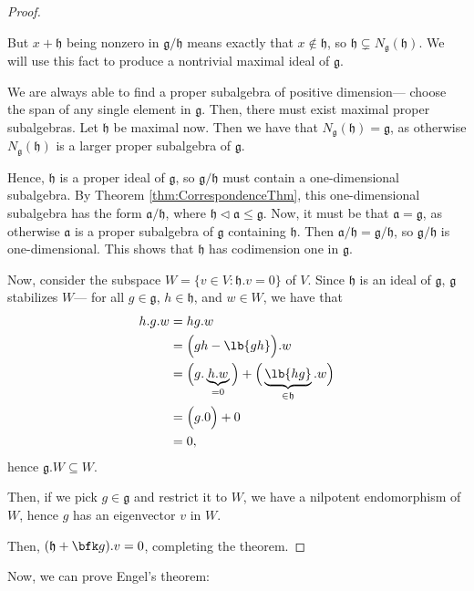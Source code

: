 \documentclass{article}
\newcommand*\tle{\ensuremath{\mathrel{\lhd}}}
\DeclarePairedDelimiter\lb\lbrack\rbrack
\newcommand*\frka{{\ensuremath{\mathfrak{a}}}}
\newcommand*\frkg{{\ensuremath{\mathfrak{g}}}}
\newcommand*\frkh{{\ensuremath{\mathfrak{h}}}}
\newcommand*\acts{.}
\begin{document}
\begin{proof}
\begin{itemize}
            But $x + \frkh$ being nonzero in $\frkg/\frkh$ means exactly that $x \notin \frkh$, so $\frkh \subsetneq N_\frkg(\frkh)$.
            We will use this fact to produce a nontrivial maximal ideal of $\frkg$.

            We are always able to find a proper subalgebra of positive dimension--- choose the span of any single element in $\frkg$. 
            Then, there must exist maximal proper subalgebras. 
            Let $\frkh$ be maximal now. 
            Then we have that $N_\frkg(\frkh) = \frkg$, as otherwise $N_\frkg(\frkh)$ is a larger proper subalgebra of $\frkg$.

            Hence, $\frkh$ is a proper ideal of $\frkg$, so $\frkg/\frkh$ must contain a one-dimensional subalgebra.
            By Theorem \ref{thm:CorrespondenceThm}, this one-dimensional subalgebra has the form $\frka/\frkh$, where $\frkh \tle \frka \leq \frkg$.
            Now, it must be that $\frka = \frkg$, as otherwise $\frka$ is a proper subalgebra of $\frkg$ containing $\frkh$.
            Then $\frka/\frkh = \frkg/\frkh$, so $\frkg/\frkh$ is one-dimensional.
            This shows that $\frkh$ has codimension one in $\frkg$.
    \end{itemize}



    Now, consider the subspace $W = \{ v \in V : \frkh \acts v = 0 \}$ of $V$.
    Since $\frkh$ is an ideal of $\frkg$, $\frkg$ stabilizes $W$--- for all $g \in \frkg$, $h \in \frkh$, and $w \in W$, we have that
    \begin{align*}
        h \acts g \acts w
        &=
        hg \acts w
        \\
        &= 
        \Big(gh - \lb{gh}\Big) \acts w
        \\
        &=
        \Big( g \acts \underbrace{h \acts w}_{=0} \Big) + \Big(\underbrace{\lb{hg}}_{\in \frkh} \acts w\Big)
        \\
        &=
        \Big( g \acts 0 \Big) + 0
        \\
        &=
        0,
    \end{align*}
    hence $\frkg \acts W \subseteq W$.

    Then, if we pick $g \in \frkg$ and restrict it to $W$, we have a nilpotent endomorphism of $W$, hence $g$ has an eigenvector $v$ in $W$.

    Then, $(\frkh + \bfk g) \acts v = 0$, completing the theorem.
\end{proof}

Now, we can prove Engel's theorem:
\end{document}
